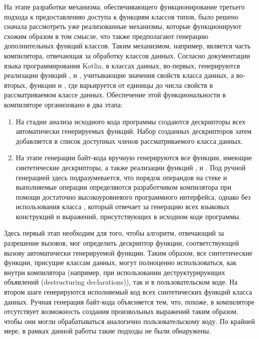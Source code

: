 На этапе разработки механизма, обеспечивающего функционирование третьего подхода к предоставлению доступа к функциям классов типов, было решено сначала рассмотреть уже реализованные механизмы, которые функционируют схожим образом в том смысле, что также предполагают генерацию дополнительных функций классов. Таким механизмом, например, является часть компилятора, отвечающая за обработку классов данных. Согласно документации языка программирования Kotlin, в классах данных, во-первых, генерируются реализации функций ,  и , учитывающие значения свойств класса данных, а во-вторых, функции  и , где  варьируется от единицы до числа свойств в рассматриваемом классе данных. Обеспечение этой функциональности в компиляторе организовано в два этапа:
\begin{enumerate}
    \item На стадии анализа исходного кода программы создаются дескрипторы всех автоматически генерируемых функций. Набор созданных дескрипторов затем добавляется в список доступных членов рассматриваемого класса данных. 
    \item На этапе генерации байт-кода вручную генерируются все функции, имеющие синтетические дескрипторы, а также реализации функций ,  и . Под ручной генерацией здесь подразумевается, что порядок операндов на стеке и выполняемые операции определяются разработчиком компилятора при помощи достаточно высокоуровневого программного интерфейса, однако без использования класса , который отвечает за генерацию всех языковых конструкций и выражений, присутствующих в исходном коде программы.   
\end{enumerate}
Здесь первый этап необходим для того, чтобы алгоритм, отвечающий за разрешение вызовов, мог определить дескриптор функции, соответствующей вызову автоматически генерируемой функции. Таким образом, все синтетические функции, присущие классам данных, могут полноценно использоваться, как внутри компилятора (например, при использовании деструктурирующих объявлений (destructuring declarations)), так и в пользовательском коде. На втором шаге генерируются исполняемый код всех синтетических функций класса данных. Ручная генерация байт-кода объясняется тем, что, похоже, в компиляторе отсутствует возможность создания произвольных выражений таким образом, чтобы они могли обрабатываться аналогично пользовательскому коду. По крайней мере, в рамках данной работы такие подходы не были обнаружены. 


